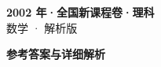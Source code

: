 \documentclass[zihao=-4, a4paper]{ctexart}
\begin{document}
\begin{center}
  {\Large\bfseries 2002 年·全国新课程卷·理科}\\[4pt]
  {\large 数学 · 解析版}
\end{center}
\medskip
{}

\clearpage
{}
\begin{center}{\Large\bfseries 参考答案与详细解析}\end{center}
\medskip

\end{document}
